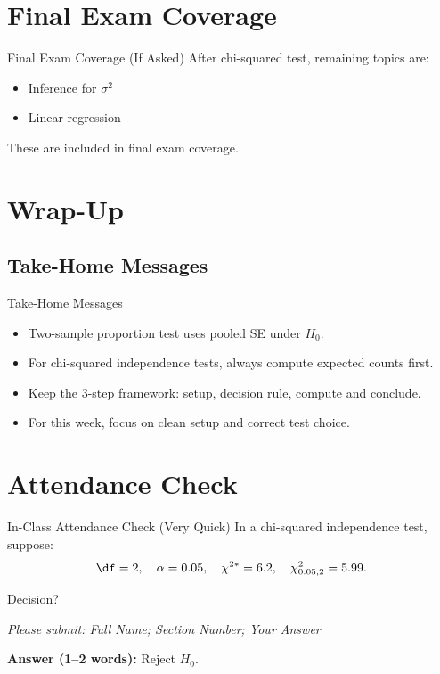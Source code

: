 \documentclass[aspectratio=169]{beamer}
\begin{document}
\section{Final Exam Coverage}

\begin{frame}{Final Exam Coverage (If Asked)}
  After chi-squared test, remaining topics are:
  \begin{itemize}
    \item Inference for \(\sigma^2\)
    \item Linear regression
  \end{itemize}
  These are included in final exam coverage.
\end{frame}

\section{Wrap-Up}

\subsection{Take-Home Messages}
\begin{frame}{Take-Home Messages}
  \begin{itemize}
    \item Two-sample proportion test uses pooled SE under \(H_0\).
    \item For chi-squared independence tests, always compute expected counts first.
    \item Keep the 3-step framework: setup, decision rule, compute and conclude.
    \item For this week, focus on clean setup and correct test choice.
  \end{itemize}
\end{frame}

\section{Attendance Check}

\begin{frame}{In-Class Attendance Check (Very Quick)}
  In a chi-squared independence test, suppose:
  \[
    \df=2,\quad \alpha=0.05,\quad \chi^{2*}=6.2,
    \quad \chi^2_{0.05,2}=5.99.
  \]

  Decision?

  \vspace{3mm}
  \textit{Please submit: Full Name; Section Number; Your Answer}

  \pause
  \vspace{2mm}
  \textbf{Answer (1--2 words):} Reject \(H_0\).
\end{frame}
\end{document}
